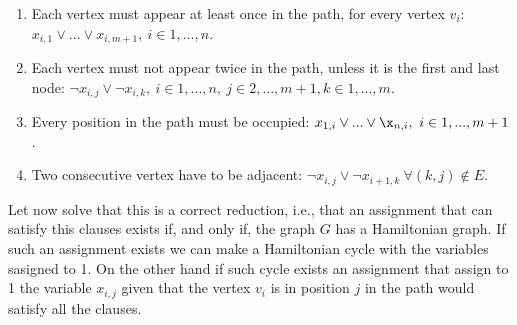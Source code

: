 \begin{enumerate}
\item Each vertex must appear at least once in the path, for every vertex $v_i$:
  $ x_{i,1} \vee ... \vee x_{i,m+1},\ i \in 1,...,n$.
\item Each vertex must not appear twice in the path, unless it is the first and last node: $\neg x_{i,j} \vee \neg x_{i,k},\ i \in 1,...,n ,\ j \in 2,...,m+1, k \in 1,...,m$.
\item Every position in the path must be occupied:   $ x_{1,i} \vee ... \vee \x_{n,i},\ i \in 1,...,m+1$.
\item Two consecutive vertex have to be adjacent: $\neg x_{i,j} \vee \neg x_{i+1,k}\ \forall (k,j) \not \in E$.
\end{enumerate}

Let now solve that this is a correct reduction, i.e., that an assignment that can satisfy this clauses exists if, and only if, the graph $G$ has a Hamiltonian graph. If such an assignment exists we can make a Hamiltonian cycle with the variables sasigned to 1. On the other hand if such cycle exists an assignment that assign to 1 the variable $x_{i,j}$ given that the vertex $v_i$ is in position $j$ in the path would satisfy all the clauses. 
